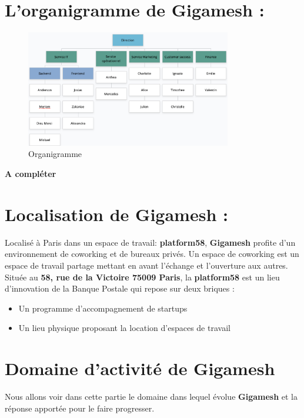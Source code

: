 
\section{L’organigramme de Gigamesh :}
 \begin{figure}[!th]
            \centering
                \includegraphics[width=0.8\textwidth]{Figures/orga}
	       \decoRule
		\caption[Organigramme]{Organigramme}
	\label{fig:Organigramme}
\end{figure}
 \textbf{A compléter}

\section{Localisation de Gigamesh :}

Localisé à Paris dans un espace de travail: \textbf{platform58}, \textbf{Gigamesh } profite d’un environnement de coworking et de bureaux privés. Un espace de coworking est un espace de travail partage mettant en avant l’échange et l’ouverture aux autres. Située au \textbf{58, rue de la Victoire 75009 Paris}, la \textbf{platform58} est un lieu d’innovation de la Banque Postale qui
repose sur deux briques :
\begin{itemize}
	\item Un programme d’accompagnement de startups
	\item Un lieu physique proposant la location d’espaces de travail
\end{itemize}

\section{Domaine d’activité de Gigamesh}
Nous allons voir dans cette partie le domaine dans lequel évolue \textbf{Gigamesh} et la réponse apportée pour le faire progresser.

